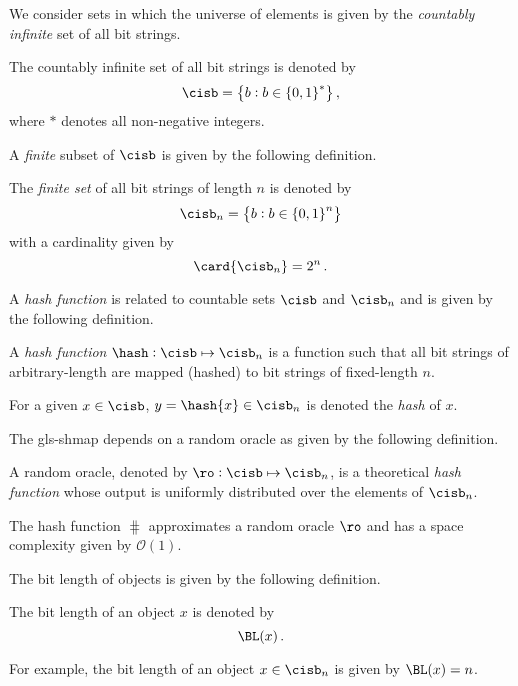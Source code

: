 \documentclass{article}
\begin{document}
We consider sets in which the universe of elements is given by the \emph{countably infinite} set of all bit strings.
\begin{definition}
The countably infinite set of all bit strings is denoted by
\begin{equation}
    \cisb = \left\{b : b \in \left\{0,1\right\}^*\right\},
\end{equation}
where $*$ denotes all non-negative integers.
\end{definition}
A \emph{finite} subset of $\cisb$ is given by the following definition.
\begin{definition}
The \emph{finite set} of all bit strings of length $n$ is denoted by
\begin{equation}
    \cisb_n = \left\{b : b \in \left\{0,1\right\}^n\right\}
\end{equation}
with a cardinality given by
\begin{equation}
    \card{\cisb_n} = 2^n\,.
\end{equation}
\end{definition}

A \emph{hash function} is related to countable sets $\cisb$ and $\cisb_n$ and is given by the following definition.
\begin{definition}
A \emph{hash function} $\hash : \cisb \mapsto \cisb_n$ is a function such that all bit strings of arbitrary-length are mapped (hashed) to bit strings of fixed-length $n$.
\end{definition}
For a given $x \in \cisb$, $y = \hash{x} \in \cisb_n$ is denoted the \emph{hash} of $x$.


The \gls{gls-shmap} depends on a random oracle as given by the following definition.
\begin{definition}
\label{def:randomoracle}
A random oracle, denoted by $\ro : \cisb \mapsto \cisb_n$, is a theoretical \emph{hash function} whose output is uniformly distributed over the elements of $\cisb_n$.
\end{definition}
\begin{assumption}
The hash function $\hash$ approximates a random oracle $\ro$ and has a space complexity given by $\mathcal{O}(1)$.
\end{assumption}

The bit length of objects is given by the following definition.
\begin{definition}
The bit length of an object $x$ is denoted by
\begin{equation}
    \BL(x)\,.
\end{equation}
\end{definition}
For example, the bit length of an object $x \in \cisb_n$ is given by $\BL(x) = n$.
\end{document}
